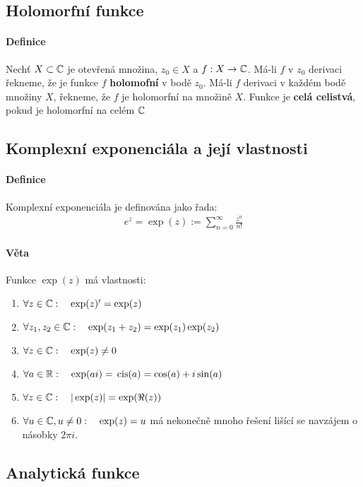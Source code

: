 \documentclass[a4paper,10pt]{article}
\begin{document}
\subsection{Holomorfní funkce}
\label{holomorfni-funkce}
\setcounter{equation}{0}
\paragraph{Definice}
Nechť $X \subset \mathbb{C}$ je otevřená množina, $z_0 \in X$ a $f: X \to \mathbb{C}$. Má-li $f$
v $z_0$ derivaci řekneme, že je funkce $f$ \textbf{holomofní} v bodě $z_0$.
Má-li $f$ derivaci v každém bodě množiny $X$, řekneme, že $f$ je holomorfní na množině $X$.
Funkce je \textbf{celá celistvá}, pokud je holomorfní na celém $\mathbb{C}$


\subsection{Komplexní exponenciála a její vlastnosti}
\label{komplexni-exponenciala}
\setcounter{equation}{0}
\paragraph{Definice}
Komplexní exponenciála je definována jako řada:
\begin{align*}
	e^z = \exp(z) := \sum_{n=0}^\infty \frac{z^n}{n!}
\end{align*}
\paragraph{Věta} Funkce $\exp(z)$ má vlastnosti:
\begin{enumerate}
	\item $\forall z \in \mathbb{C}: \quad \exp(z)' = \exp(z)$
	\item $\forall z_1, z_2 \in \mathbb{C}: \quad \exp(z_1 + z_2) = \exp(z_1)\exp(z_2)$
	\item $\forall z \in \mathbb{C}: \quad \exp(z) \neq 0$
	\item $\forall a \in \mathbb{R}: \quad \exp(ai) = \operatorname*{\,cis}(a) = \cos(a) + i\sin(a)$
	\item $\forall z \in \mathbb{C}: \quad |\exp(z)| = \exp(\Re(z))$
	\item $\forall u \in \mathbb{C}, u \neq 0: \quad \exp(z) = u$ má nekonečně mnoho
	řešení lišící se navzájem o násobky $2\pi i$.
\end{enumerate}


\subsection{Analytická funkce}
\label{analyticka-funkce}
\setcounter{equation}{0}
\end{document}
